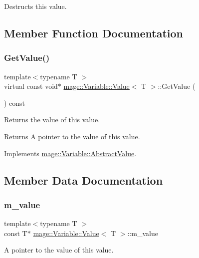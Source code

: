 Destructs this value. 

\subsection{Member Function Documentation}
\hypertarget{structmage_1_1_variable_1_1_value_afd0b93364cba9a55182f126fdcc79b50}{}\label{structmage_1_1_variable_1_1_value_afd0b93364cba9a55182f126fdcc79b50} 
\subsubsection{\texorpdfstring{Get\+Value()}{GetValue()}}
{\footnotesize\ttfamily template$<$typename T $>$ \\
virtual const void$\ast$ \hyperlink{structmage_1_1_variable_1_1_value}{mage\+::\+Variable\+::\+Value}$<$ T $>$\+::Get\+Value (\begin{DoxyParamCaption}{ }\end{DoxyParamCaption}) const\hspace{0.3cm}{\ttfamily [virtual]}}

Returns the value of this value.

\begin{DoxyReturn}{Returns}
A pointer to the value of this value. 
\end{DoxyReturn}


Implements \hyperlink{structmage_1_1_variable_1_1_abstract_value_aede2a77b571b80794a4254e34144f4c1}{mage\+::\+Variable\+::\+Abstract\+Value}.



\subsection{Member Data Documentation}
\hypertarget{structmage_1_1_variable_1_1_value_aa15243b8811b108a0c7bff05456e377c}{}\label{structmage_1_1_variable_1_1_value_aa15243b8811b108a0c7bff05456e377c} 
\subsubsection{\texorpdfstring{m\+\_\+value}{m\_value}}
{\footnotesize\ttfamily template$<$typename T $>$ \\
const T$\ast$ \hyperlink{structmage_1_1_variable_1_1_value}{mage\+::\+Variable\+::\+Value}$<$ T $>$\+::m\+\_\+value\hspace{0.3cm}{\ttfamily [private]}}

A pointer to the value of this value. 